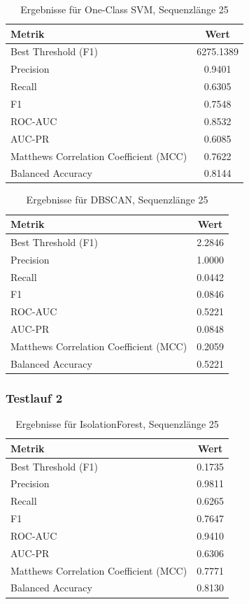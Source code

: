 \documentclass[a4paper,12pt]{article}
\begin{document}
	\begin{table}[H]
		\centering
		\begin{tabular}{l c}
			\hline
			Metrik & Wert \\
			\hline
			Best Threshold (F1) & 6275.1389 \\
			Precision & 0.9401 \\
			Recall & 0.6305 \\
			F1 & 0.7548 \\
			ROC-AUC & 0.8532 \\
			AUC-PR & 0.6085 \\
			Matthews Correlation Coefficient (MCC) & 0.7622 \\
			Balanced Accuracy & 0.8144 \\
			\hline
		\end{tabular}
		\caption{Ergebnisse für One-Class SVM, Sequenzlänge 25}
	\end{table}
	
	\begin{table}[H]
		\centering
		\begin{tabular}{l c}
			\hline
			Metrik & Wert \\
			\hline
			Best Threshold (F1) & 2.2846 \\
			Precision & 1.0000 \\
			Recall & 0.0442 \\
			F1 & 0.0846 \\
			ROC-AUC & 0.5221 \\
			AUC-PR & 0.0848 \\
			Matthews Correlation Coefficient (MCC) & 0.2059 \\
			Balanced Accuracy & 0.5221 \\
			\hline
		\end{tabular}
		\caption{Ergebnisse für DBSCAN, Sequenzlänge 25}
	\end{table}
	
	\subsubsection{Testlauf 2}
	
	\begin{table}[H]
		\centering
		\begin{tabular}{l c}
			\hline
			Metrik & Wert \\
			\hline
			Best Threshold (F1) & 0.1735 \\
			Precision & 0.9811 \\
			Recall & 0.6265 \\
			F1 & 0.7647 \\
			ROC-AUC & 0.9410 \\
			AUC-PR & 0.6306 \\
			Matthews Correlation Coefficient (MCC) & 0.7771 \\
			Balanced Accuracy & 0.8130 \\
			\hline
		\end{tabular}
		\caption{Ergebnisse für IsolationForest, Sequenzlänge 25}
	\end{table}
	
\end{document}
